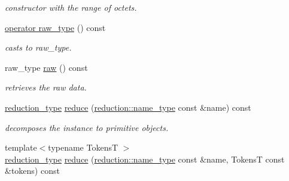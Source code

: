 \begin{DoxyCompactItemize}
\begin{DoxyCompactList}\small\item\em constructor with the range of octets. \end{DoxyCompactList}\item 
\hypertarget{classhryky_1_1_kind_ad9404ff9e73a1f7ab6a5a0cd85db4e68}{\hyperlink{classhryky_1_1_kind_ad9404ff9e73a1f7ab6a5a0cd85db4e68}{operator raw\-\_\-type} () const }\label{classhryky_1_1_kind_ad9404ff9e73a1f7ab6a5a0cd85db4e68}

\begin{DoxyCompactList}\small\item\em casts to raw\-\_\-type. \end{DoxyCompactList}\item 
\hypertarget{classhryky_1_1_kind_a092c3dbb200b1fc4e83bebff274ba23e}{raw\-\_\-type \hyperlink{classhryky_1_1_kind_a092c3dbb200b1fc4e83bebff274ba23e}{raw} () const }\label{classhryky_1_1_kind_a092c3dbb200b1fc4e83bebff274ba23e}

\begin{DoxyCompactList}\small\item\em retrieves the raw data. \end{DoxyCompactList}\item 
\hypertarget{classhryky_1_1_kind_ab11ab99ebf2c6d081648de78e8d7241f}{\hyperlink{namespacehryky_a343a9a4c36a586be5c2693156200eadc}{reduction\-\_\-type} \hyperlink{classhryky_1_1_kind_ab11ab99ebf2c6d081648de78e8d7241f}{reduce} (\hyperlink{namespacehryky_1_1reduction_ac686c30a4c8d196bbd0f05629a6b921f}{reduction\-::name\-\_\-type} const \&name) const }\label{classhryky_1_1_kind_ab11ab99ebf2c6d081648de78e8d7241f}

\begin{DoxyCompactList}\small\item\em decomposes the instance to primitive objects. \end{DoxyCompactList}\item 
\hypertarget{classhryky_1_1_kind_ac4183ddb871fea3cdb2251ce6170c584}{{\footnotesize template$<$typename Tokens\-T $>$ }\\\hyperlink{namespacehryky_a343a9a4c36a586be5c2693156200eadc}{reduction\-\_\-type} \hyperlink{classhryky_1_1_kind_ac4183ddb871fea3cdb2251ce6170c584}{reduce} (\hyperlink{namespacehryky_1_1reduction_ac686c30a4c8d196bbd0f05629a6b921f}{reduction\-::name\-\_\-type} const \&name, Tokens\-T const \&tokens) const }\label{classhryky_1_1_kind_ac4183ddb871fea3cdb2251ce6170c584}


\end{DoxyCompactItemize}
